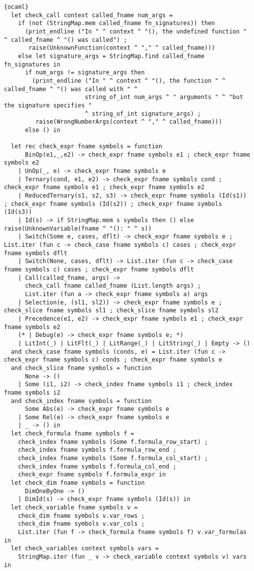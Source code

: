 \begin{lstlisting}{ocaml}
  let check_call context called_fname num_args =
    if (not (StringMap.mem called_fname fn_signatures)) then
      (print_endline ("In " ^ context ^ "(), the undefined function " ^ called_fname ^ "() was called") ;
       raise(UnknownFunction(context ^ "," ^ called_fname)))
    else let signature_args = StringMap.find called_fname fn_signatures in
      if num_args != signature_args then
        (print_endline ("In " ^ context ^ "(), the function " ^ called_fname ^ "() was called with " ^
                       string_of_int num_args ^ " arguments " ^ "but the signature specifies "
                       ^ string_of_int signature_args) ;
         raise(WrongNumberArgs(context ^ "," ^ called_fname)))
      else () in

  let rec check_expr fname symbols = function
      BinOp(e1,_,e2) -> check_expr fname symbols e1 ; check_expr fname symbols e2
    | UnOp(_, e) -> check_expr fname symbols e
    | Ternary(cond, e1, e2) -> check_expr fname symbols cond ; check_expr fname symbols e1 ; check_expr fname symbols e2
    | ReducedTernary(s1, s2, s3) -> check_expr fname symbols (Id(s1)) ; check_expr fname symbols (Id(s2)) ; check_expr fname symbols (Id(s3))
    | Id(s) -> if StringMap.mem s symbols then () else raise(UnknownVariable(fname ^ "(): " ^ s))
    | Switch(Some e, cases, dflt) -> check_expr fname symbols e ; List.iter (fun c -> check_case fname symbols c) cases ; check_expr fname symbols dflt
    | Switch(None, cases, dflt) -> List.iter (fun c -> check_case fname symbols c) cases ; check_expr fname symbols dflt
    | Call(called_fname, args) ->
      check_call fname called_fname (List.length args) ;
      List.iter (fun a -> check_expr fname symbols a) args
    | Selection(e, (sl1, sl2)) -> check_expr fname symbols e ; check_slice fname symbols sl1 ; check_slice fname symbols sl2
    | Precedence(e1, e2) -> check_expr fname symbols e1 ; check_expr fname symbols e2
    (* | Debug(e) -> check_expr fname symbols e; *)
    | LitInt(_) | LitFlt(_) | LitRange(_) | LitString(_) | Empty -> ()
  and check_case fname symbols (conds, e) = List.iter (fun c -> check_expr fname symbols c) conds ; check_expr fname symbols e
  and check_slice fname symbols = function
      None -> ()
    | Some (i1, i2) -> check_index fname symbols i1 ; check_index fname symbols i2
  and check_index fname symbols = function
      Some Abs(e) -> check_expr fname symbols e
    | Some Rel(e) -> check_expr fname symbols e
    | _ -> () in
  let check_formula fname symbols f =
    check_index fname symbols (Some f.formula_row_start) ;
    check_index fname symbols f.formula_row_end ;
    check_index fname symbols (Some f.formula_col_start) ;
    check_index fname symbols f.formula_col_end ;
    check_expr fname symbols f.formula_expr in
  let check_dim fname symbols = function
      DimOneByOne -> ()
    | DimId(s) -> check_expr fname symbols (Id(s)) in
  let check_variable fname symbols v =
    check_dim fname symbols v.var_rows ;
    check_dim fname symbols v.var_cols ;
    List.iter (fun f -> check_formula fname symbols f) v.var_formulas in
  let check_variables context symbols vars =
    StringMap.iter (fun _ v -> check_variable context symbols v) vars in


\end{lstlisting}

